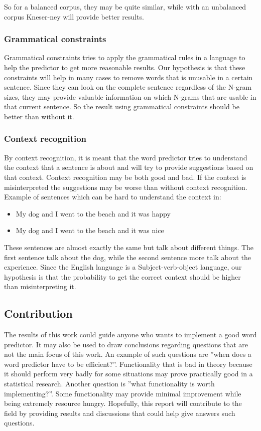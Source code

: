 So for a balanced corpus, they may be quite similar, while with an unbalanced corpus Kneser-ney will provide better results.
\subsubsection{Grammatical constraints}
Grammatical constraints tries to apply the grammatical rules in a language to help the predictor to get more reasonable results. Our hypothesis is that these constraints will help in many cases to remove words that is unusable in a certain sentence. Since they can look on the complete sentence regardless of the N-gram sizes, they may provide valuable information on which N-grams that are usable in that current sentence. So the result using grammatical constraints should be better than without it.
\subsubsection{Context recognition}
By context recognition, it is meant that the word predictor tries to understand the context that a sentence is about and will try to provide suggestions based on that context. Context recognition may be both good and bad. If the context is misinterpreted the suggestions may be worse than without context recognition. Example of sentences which can be hard to understand the context in:

\begin{itemize}
\item My dog and I went to the beach and it was happy
\item My dog and I went to the beach and it was nice
\end{itemize}
These sentences are almost exactly the same but talk about different things. The first sentence talk about the dog, while the second sentence more talk about the experience.
Since the English language is a Subject-verb-object language, our hypothesis is that the probability to get the correct context should be higher than misinterpreting it.

\subsection{Contribution}
The results of this work could guide anyone who wants to implement a good word predictor. It may also be used to draw conclusions regarding questions that are not the main focus of this work. An example of such questions are ''when does a word predictor have to be efficient?''. Functionality that is bad in theory because it should perform very badly for some situations may prove practically good in a statistical research. Another question is ''what functionality is worth implementing?''. Some functionality may provide minimal improvement while being extremely resource hungry. Hopefully, this report will contribute to the field by providing results and discussions that could help give answers such questions.

